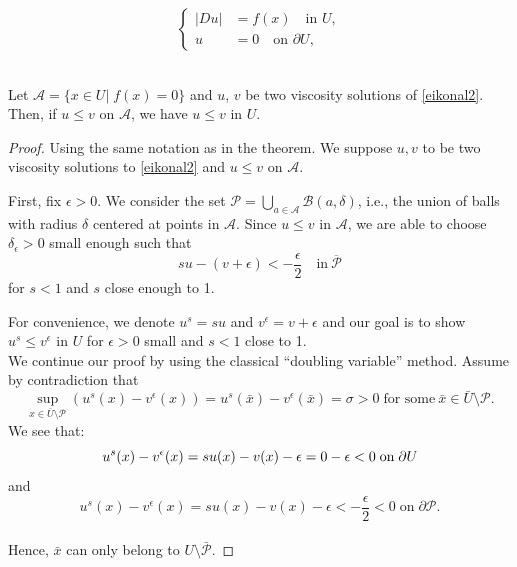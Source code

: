 \documentclass[10pt,a4paper]{amsart}
\newcommand{\cB}{\mathcal{B}}
\begin{document}
\begin{equation}\label{eikonal2}
\left\{
\begin{aligned}
|Du| &= f(x) \quad \text{in } U,\\
u &= 0 \quad \text{on } \partial U,
\end{aligned} 
\right.    
\end{equation}\\

\begin{thm}
    Let $\mathcal{A}=\{x\in U| \;f(x)=0\}$ and $u$, $v$ be two viscosity solutions of \eqref{eikonal2}. Then, if $u\le v$ on $\mathcal{A}$, we have $u\le v$ in $U$.
\end{thm}

\begin{proof}
    Using the same notation as in the theorem. We suppose $u,v$ to be two viscosity solutions to \eqref{eikonal2} and $u\le v$ on $\mathcal{A}$.
    
    First, fix $\epsilon>0$. We consider the set $\mathcal{P}=\bigcup_{a\in\mathcal{A}}\cB(a,\delta)$, i.e., the union of balls with radius \( \delta \) centered at points in \( \mathcal{A} \). Since $u\le v$ in $\mathcal{A}$, we are able to choose $\delta_{\epsilon}>0$ small enough such that 
    \[
    su-(v+\epsilon)< -\frac{\epsilon}{2} \quad \text{in} \ \overline{\mathcal{P}}
    \]
for $s<1$ and $s$ close enough to 1.

For convenience, we denote $u^s = su$ and $v^{\epsilon}= v+\epsilon$ and our goal is to show $u^s \le v^{\epsilon}$ in $U$ for $\epsilon >0$ small and $s<1$ close to 1.\\
We continue our proof by using the classical ``doubling variable'' method. Assume by contradiction that 
\[
    \sup_{x\in \bar{U}\setminus\mathcal{P}}(u^s (x)-v^{\epsilon}(x)) = u^s (\bar x)-v^{\epsilon}(\bar x)= \sigma >0 \; \text{for some} \ \bar x\in \bar U\setminus \mathcal{P}.
\]
We see that:
\[
    u^{s}(x)-v^{\epsilon}(x) = su(x)-v(x)-\epsilon = 0-\epsilon<0 \; \text{on}\;\partial U \\
\]
and
\[
    u^s (x)-v^{\epsilon}(x) = su(x)-v(x)-\epsilon<-\frac{\epsilon}{2}<0 \;\text{on}\; \partial \mathcal{P}. 
\]\\
Hence, $\bar x $ can only belong to $U\setminus \mathcal{\bar P}$.


\end{proof}
\end{document}
